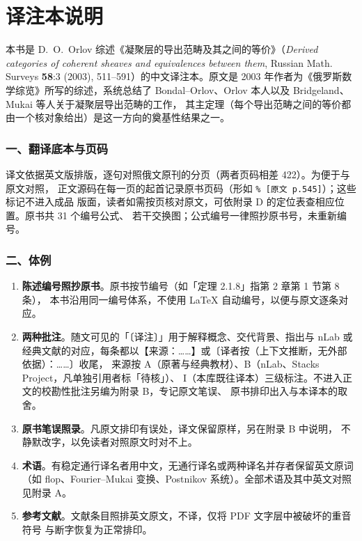 \thispagestyle{empty}
\chapter*{译注本说明}

本书是 D.~O.~Orlov 综述《凝聚层的导出范畴及其之间的等价》（\emph{Derived categories of
coherent sheaves and equivalences between them}, Russian Math. Surveys \textbf{58}:3 (2003),
511--591）的中文译注本。原文是 2003 年作者为《俄罗斯数学综览》所写的综述，系统总结了
Bondal--Orlov、Orlov 本人以及 Bridgeland、Mukai 等人关于凝聚层导出范畴的工作，
其主定理（每个导出范畴之间的等价都由一个核对象给出）是这一方向的奠基性结果之一。

\subsection*{一、翻译底本与页码}

译文依据英文版排版，逐句对照俄文原刊的分页（两者页码相差 422）。为便于与原文对照，
正文源码在每一页的起首记录原书页码（形如 \texttt{\% [原文 p.545]}）；这些标记不进入成品
版面，读者如需按页核对原文，可依附录 D 的定位表查相应位置。原书共 31 个编号公式、
若干交换图；公式编号一律照抄原书号，未重新编号。

\subsection*{二、体例}

\begin{enumerate}[label=（\arabic*）,leftmargin=2.6em,itemsep=2pt,topsep=4pt]
\item \textbf{陈述编号照抄原书}。原书按节编号（如「定理 2.1.8」指第 2 章第 1 节第 8 条），
      本书沿用同一编号体系，不使用 LaTeX 自动编号，以便与原文逐条对应。
\item \textbf{两种批注}。随文可见的「〔译注〕」用于解释概念、交代背景、指出与 nLab 或
      经典文献的对应，每条都以【来源：……】或〔译者按（上下文推断，无外部依据）：……〕收尾，
      来源按 A（原著与经典教材）、B（nLab、Stacks Project，凡单独引用者标「待核」）、
      I（本库既往译本）三级标注。不进入正文的校勘性批注另编为附录 B，专记原文笔误、
      原书排印出入与本译本的取舍。
\item \textbf{原书笔误照录}。凡原文排印有误处，译文保留原样，另在附录 B 中说明，
      不静默改字，以免读者对照原文时对不上。
\item \textbf{术语}。有稳定通行译名者用中文，无通行译名或两种译名并存者保留英文原词
      （如 flop、Fourier--Mukai 变换、Postnikov 系统）。全部术语及其中英文对照见附录 A。
\item \textbf{参考文献}。文献条目照排英文原文，不译，仅将 PDF 文字层中被破坏的重音符号
      与断字恢复为正常排印。
\end{enumerate}


